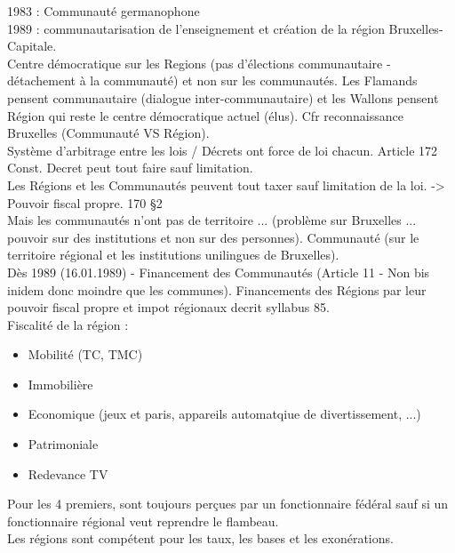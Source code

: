 \documentclass{book}
\begin{document}
1983 : Communauté germanophone\\

1989 : communautarisation de l'enseignement et création de la région Bruxelles-Capitale.\\

Centre démocratique sur les Regions (pas d'élections communautaire - détachement à la communauté) et non sur les communautés. Les Flamands pensent communautaire (dialogue inter-communautaire) et les Wallons pensent Région qui reste le centre démocratique actuel (élus). Cfr reconnaissance Bruxelles (Communauté VS Région).\\

Système d'arbitrage entre les lois / Décrets ont force de loi chacun. Article 172 Const. Decret peut tout faire sauf limitation.\\

Les Régions et les Communautés peuvent tout taxer sauf limitation de la loi. -> Pouvoir fiscal propre. 170 §2\\ 

Mais les communautés n'ont pas de territoire ... (problème sur Bruxelles ... pouvoir sur des institutions et non sur des personnes). Communauté (sur le territoire régional et les institutions unilingues de Bruxelles).\\

Dès 1989 (16.01.1989) - Financement des Communautés (Article 11 - Non bis inidem donc moindre que les communes). Financements des Régions par leur pouvoir fiscal propre et impot régionaux decrit syllabus 85.\\

Fiscalité de la région :
\begin{itemize}
\item Mobilité (TC, TMC)
\item Immobilière
\item Economique (jeux et paris, appareils automatqiue de divertissement, ...)
\item Patrimoniale
\item Redevance TV
\end{itemize}
\null

Pour les 4 premiers, sont toujours perçues par un fonctionnaire fédéral sauf si un fonctionnaire régional veut reprendre le flambeau.\\

Les régions sont compétent pour les taux, les bases et les exonérations.\\
\end{document}
